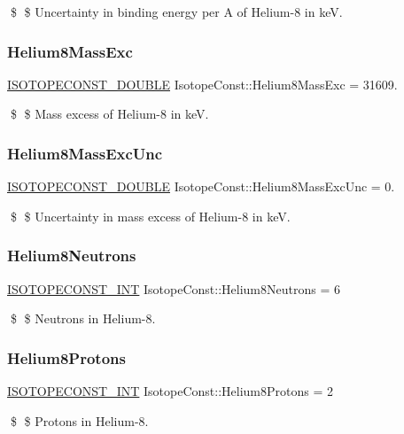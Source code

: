 \$ \$ Uncertainty in binding energy per A of Helium-\/8 in keV. \mbox{\label{group___isotope_const-_helium-_he8_gababfcb58ec855af21efd7c839e92f45d}} 
\subsubsection{\texorpdfstring{Helium8\+Mass\+Exc}{Helium8MassExc}}
{\footnotesize\ttfamily \mbox{\hyperlink{group___isotope_const-_macros_ga8f45a7272ce02c0b4c65c44636ed719a}{I\+S\+O\+T\+O\+P\+E\+C\+O\+N\+S\+T\+\_\+\+D\+O\+U\+B\+LE}} Isotope\+Const\+::\+Helium8\+Mass\+Exc = 31609.}

\$ \$ Mass excess of Helium-\/8 in keV. \mbox{\label{group___isotope_const-_helium-_he8_ga19bbac85bafb8580f7cef1f549d32dc5}} 
\subsubsection{\texorpdfstring{Helium8\+Mass\+Exc\+Unc}{Helium8MassExcUnc}}
{\footnotesize\ttfamily \mbox{\hyperlink{group___isotope_const-_macros_ga8f45a7272ce02c0b4c65c44636ed719a}{I\+S\+O\+T\+O\+P\+E\+C\+O\+N\+S\+T\+\_\+\+D\+O\+U\+B\+LE}} Isotope\+Const\+::\+Helium8\+Mass\+Exc\+Unc = 0.}

\$ \$ Uncertainty in mass excess of Helium-\/8 in keV. \mbox{\label{group___isotope_const-_helium-_he8_gaa5fde639f1fcda867316caf80d8cc8f9}} 
\subsubsection{\texorpdfstring{Helium8\+Neutrons}{Helium8Neutrons}}
{\footnotesize\ttfamily \mbox{\hyperlink{group___isotope_const-_macros_ga5f18360b3e99483a35c32d789e62621c}{I\+S\+O\+T\+O\+P\+E\+C\+O\+N\+S\+T\+\_\+\+I\+NT}} Isotope\+Const\+::\+Helium8\+Neutrons = 6}

\$ \$ Neutrons in Helium-\/8. \mbox{\label{group___isotope_const-_helium-_he8_ga6acc7f54da00712859050d8fc1df99df}} 
\subsubsection{\texorpdfstring{Helium8\+Protons}{Helium8Protons}}
{\footnotesize\ttfamily \mbox{\hyperlink{group___isotope_const-_macros_ga5f18360b3e99483a35c32d789e62621c}{I\+S\+O\+T\+O\+P\+E\+C\+O\+N\+S\+T\+\_\+\+I\+NT}} Isotope\+Const\+::\+Helium8\+Protons = 2}

\$ \$ Protons in Helium-\/8. 
